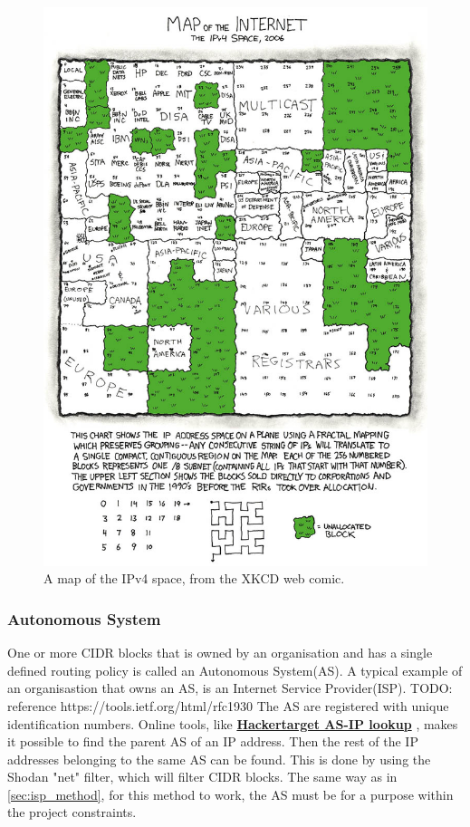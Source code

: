 \begin{figure} [H]
    \centering
    \includegraphics[scale=4]{Figurer/map_of_the_internet.jpg}
    \caption{A map of the IPv4 space, from the XKCD web comic. \cite{xkcd} }
    \label{fig:ipv4_map}
\end{figure}

\subsubsection{Autonomous System}
One or more CIDR blocks that is owned by an organisation and has a single defined routing policy is called an Autonomous System(AS). A typical example of an organisastion that owns an AS, is an Internet Service Provider(ISP). TODO: reference https://tools.ietf.org/html/rfc1930
The AS are registered with unique identification numbers. Online tools, like \href{https://hackertarget.com/as-ip-lookup/}{\textbf{Hackertarget AS-IP lookup}} \cite{asip_lookup}, makes it possible to find the parent AS of an IP address. Then the rest of the IP addresses belonging to the same AS can be found. This is done by using the Shodan "net" filter, which will filter CIDR blocks. The same way as in \cref{sec:isp_method}, for this method to work, the AS must be for a purpose within the project constraints.


